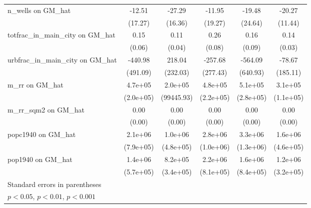 {\begin{tabular}{l*{5}{c}}
\addlinespace
n\_wells on GM\_hat&   -12.51         &   -27.29         &   -11.95         &   -19.48         &   -20.27         \\
                &  (17.27)         &  (16.36)         &  (19.27)         &  (24.64)         &  (11.44)         \\
\addlinespace
totfrac\_in\_main\_city on GM\_hat&     0.15\sym{*}  &     0.11\sym{**} &     0.26\sym{**} &     0.16         &     0.14\sym{***}\\
                &   (0.06)         &   (0.04)         &   (0.08)         &   (0.09)         &   (0.03)         \\
\addlinespace
urbfrac\_in\_main\_city on GM\_hat&  -440.98         &   218.04         &  -257.68         &  -564.09         &   -78.67         \\
                & (491.09)         & (232.03)         & (277.43)         & (640.93)         & (185.11)         \\
\addlinespace
m\_rr on GM\_hat  &  4.7e+05\sym{*}  &  2.0e+05\sym{*}  &  4.8e+05\sym{*}  &  5.1e+05         &  3.1e+05\sym{**} \\
                &(2.0e+05)         &(99445.93)         &(2.2e+05)         &(2.8e+05)         &(1.1e+05)         \\
\addlinespace
m\_rr\_sqm2 on GM\_hat&     0.00\sym{*}  &     0.00\sym{**} &     0.00\sym{**} &     0.00         &     0.00\sym{***}\\
                &   (0.00)         &   (0.00)         &   (0.00)         &   (0.00)         &   (0.00)         \\
\addlinespace
popc1940 on GM\_hat&  2.1e+06\sym{**} &  1.0e+06\sym{*}  &  2.8e+06\sym{**} &  3.3e+06\sym{*}  &  1.6e+06\sym{***}\\
                &(7.9e+05)         &(4.8e+05)         &(1.0e+06)         &(1.3e+06)         &(4.6e+05)         \\
\addlinespace
pop1940 on GM\_hat&  1.4e+06\sym{*}  &  8.2e+05\sym{*}  &  2.2e+06\sym{**} &  1.6e+06         &  1.2e+06\sym{***}\\
                &(5.7e+05)         &(3.4e+05)         &(8.1e+05)         &(8.4e+05)         &(3.2e+05)         \\
\bottomrule
\multicolumn{6}{l}{\footnotesize Standard errors in parentheses}\\
\multicolumn{6}{l}{\footnotesize \sym{*} \(p<0.05\), \sym{**} \(p<0.01\), \sym{***} \(p<0.001\)}\\
\end{tabular}
}
